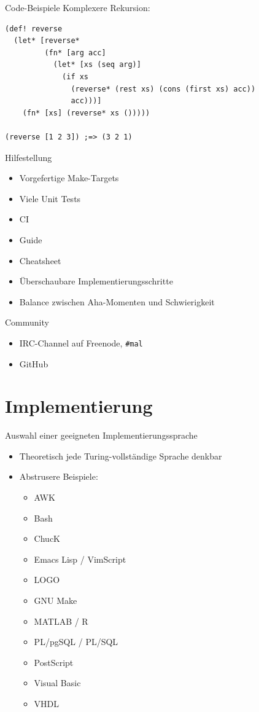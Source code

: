 \documentclass[presentation]{beamer}
\begin{document}
\begin{frame}[fragile,label=sec-2-14]{Code-Beispiele}
 Komplexere Rekursion:

\begin{verbatim}
(def! reverse
  (let* [reverse*
         (fn* [arg acc]
           (let* [xs (seq arg)]
             (if xs
               (reverse* (rest xs) (cons (first xs) acc))
               acc)))]
    (fn* [xs] (reverse* xs ()))))

(reverse [1 2 3]) ;=> (3 2 1)
\end{verbatim}
\end{frame}

\begin{frame}[label=sec-2-15]{Hilfestellung}
\begin{itemize}
\item Vorgefertige Make-Targets
\item Viele Unit Tests
\item CI
\item Guide
\item Cheatsheet
\item Überschaubare Implementierungsschritte
\item Balance zwischen Aha-Momenten und Schwierigkeit
\end{itemize}
\end{frame}

\begin{frame}[fragile,label=sec-2-16]{Community}
 \begin{itemize}
\item IRC-Channel auf Freenode, \texttt{\#mal}
\item GitHub
\end{itemize}
\end{frame}

\section{Implementierung}
\label{sec-3}

\begin{frame}[label=sec-3-1]{Auswahl einer geeigneten Implementierungssprache}
\begin{itemize}
\item Theoretisch jede Turing-vollständige Sprache denkbar
\item Abstrusere Beispiele:
\begin{itemize}
\item AWK
\item Bash
\item ChucK
\item Emacs Lisp / VimScript
\item LOGO
\item GNU Make
\item MATLAB / R
\item PL/pgSQL / PL/SQL
\item PostScript
\item Visual Basic
\item VHDL
\end{itemize}
\end{itemize}
\end{frame}
\end{document}
